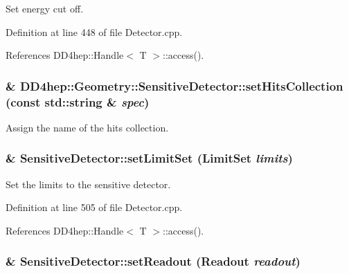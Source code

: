 Set energy cut off. 

Definition at line 448 of file Detector.cpp.

References DD4hep::Handle$<$ T $>$::access().\hypertarget{class_d_d4hep_1_1_geometry_1_1_sensitive_detector_af3b9212ce097d49f2d2de8bc625ac3e6}{
\subsubsection[{setHitsCollection}]{\& DD4hep::Geometry::SensitiveDetector::setHitsCollection (const std::string \& {\em spec})}}
\label{class_d_d4hep_1_1_geometry_1_1_sensitive_detector_af3b9212ce097d49f2d2de8bc625ac3e6}


Assign the name of the hits collection. \hypertarget{class_d_d4hep_1_1_geometry_1_1_sensitive_detector_a24994b8d62969f2d16e1cdf543a8e9bc}{
\subsubsection[{setLimitSet}]{ \& SensitiveDetector::setLimitSet ({\bf LimitSet} {\em limits})}}
\label{class_d_d4hep_1_1_geometry_1_1_sensitive_detector_a24994b8d62969f2d16e1cdf543a8e9bc}


Set the limits to the sensitive detector. 

Definition at line 505 of file Detector.cpp.

References DD4hep::Handle$<$ T $>$::access().\hypertarget{class_d_d4hep_1_1_geometry_1_1_sensitive_detector_a8f7a8a0c01fbddbfd645d19171d78f22}{
\subsubsection[{setReadout}]{ \& SensitiveDetector::setReadout ({\bf Readout} {\em readout})}}
\label{class_d_d4hep_1_1_geometry_1_1_sensitive_detector_a8f7a8a0c01fbddbfd645d19171d78f22}


